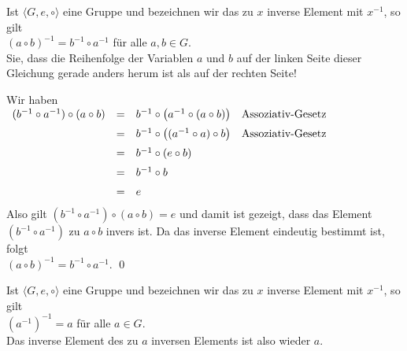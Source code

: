 \begin{Satz}[$(a \circ b)^{-1} = b^{-1} \circ a^{-1}$] \lb
  Ist $\langle G, e, \circ \rangle$ eine Gruppe und bezeichnen wir das zu $x$ inverse Element mit
  $x^{-1}$, so gilt
  \\[0.2cm]
  \hspace*{1.3cm}
  $(a \circ b)^{-1} = b^{-1} \circ a^{-1}$ \quad f\"{u}r alle $a,b \in G$.
  \\[0.2cm]
  \textbf{\color{red}{Beachten}} Sie, dass die Reihenfolge der Variablen $a$ und $b$ auf der linken Seite dieser
  Gleichung gerade anders herum ist als auf der rechten Seite!
\end{Satz}

\proof
Wir haben
\\[0.2cm]
\hspace*{1.3cm}
$
\begin{array}[t]{lcll}
  (b^{-1} \circ a^{-1}) \circ (a \circ b) & = & b^{-1} \circ \bigl(a^{-1} \circ (a \circ b)\bigr) 
                                              & \mbox{Assoziativ-Gesetz} \\[0.2cm]
                                          & = & b^{-1} \circ \bigl((a^{-1} \circ a) \circ b\bigr) 
                                              & \mbox{Assoziativ-Gesetz} \\[0.2cm]
                                          & = & b^{-1} \circ (e \circ b) \\[0.2cm]
                                          & = & b^{-1} \circ b \\[0.2cm]
                                          & = & e \\[0.2cm]
\end{array}
$
\\[0.2cm]
Also gilt $(b^{-1} \circ a^{-1}) \circ (a \circ b) = e$ und damit ist gezeigt,  dass das Element
$(b^{-1} \circ a^{-1})$ zu $a \circ b$ invers ist.  Da das inverse Element eindeutig bestimmt ist, folgt
\\[0.2cm]
\hspace*{1.3cm}
$(a \circ b)^{-1} = b^{-1} \circ a^{-1}$. \qed


\begin{Satz}[$(a^{-1})^{-1} = a$]
  Ist $\langle G, e, \circ \rangle$ eine Gruppe und bezeichnen wir das zu $x$ inverse Element mit
  $x^{-1}$, so gilt
  \\[0.2cm]
  \hspace*{1.3cm}
  $(a^{-1})^{-1} = a$ \quad f\"{u}r alle $a \in G$.
  \\[0.2cm]
  Das inverse Element des zu $a$ inversen Elements ist also wieder $a$.
\end{Satz}

